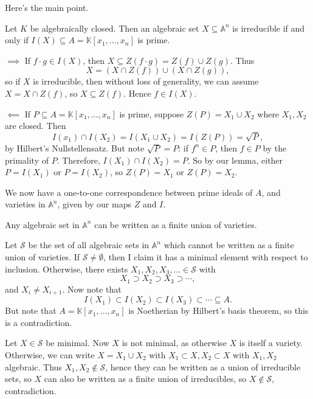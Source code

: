 \documentclass[12pt]{article}
\begin{document}
Here's the main point.

\begin{proposition}
	Let $K$ be algebraically closed. Then an algebraic set $X \subseteq \mathbb{A}^n$ is irreducible if and only if $I(X) \subseteq A = \mathbb{K}[x_1, \ldots, x_n]$ is prime.
\end{proposition}


\begin{proofbox}
	

	$\implies$ If $f \cdot g \in I(X)$, then $X \subseteq Z(f \cdot g) = Z(f) \cup Z(g)$. Thus
	\[
	X = (X \cap Z(f)) \cup (X \cap Z(g)),
	\]
	so if $X$ is irreducible, then without loss of generality, we can assume $X = X \cap Z(f)$, so $X \subseteq Z(f)$. Hence $f \in I(X)$.

	$\impliedby$ If $P \subseteq A = \mathbb{K}[x_1, \ldots, x_n]$ is prime, suppose $Z(P) = X_1 \cup X_2$ where $X_1, X_2$ are closed. Then
	\[
	I(x_1) \cap I(X_2) = I(X_1 \cup X_2) = I(Z(P)) = \sqrt P,
	\]
	by Hilbert's Nullstellensatz. But note $\sqrt P = P$: if $f^n \in P$, then $f \in P$ by the primality of $P$. Therefore, $I(X_1) \cap I(X_2) = P$. So by our lemma, either $P = I(X_1)$ or $P = I(X_2)$, so $Z(P) = X_1$ or $Z(P) = X_2$.
\end{proofbox}

We now have a one-to-one correspondence between prime ideals of $A$, and varieties in $\mathbb{A}^n$, given by our maps $Z$ and $I$.

\begin{proposition}
	Any algebraic set in $\mathbb{A}^n$ can be written as a finite union of varieties.
\end{proposition}

\begin{proofbox}
	Let $\mathcal{S}$ be the set of all algebraic sets in $\mathbb{A}^n$ which cannot be written as a finite union of varieties. If $\mathcal{S} \neq \emptyset$, then I claim it has a minimal element with respect to inclusion. Otherwise, there exists $X_1, X_2, X_3, \ldots \in \mathcal{S}$ with
	\[
	X_1 \supset X_2 \supset X_3 \supset \cdots,
	\]
	and $X_i \neq X_{i+1}$. Now note that
	\[
	I(X_1) \subset I(X_2) \subset I(X_3) \subset \cdots \subseteq A.
	\]
	But note that $A = \mathbb{K}[x_1, \ldots, x_n]$ is Noetherian by Hilbert's basis theorem, so this is a contradiction.

	Let $X \in \mathcal{S}$ be minimal. Now $X$ is not minimal, as otherwise $X$ is itself a variety. Otherwise, we can write $X = X_1 \cup X_2$ with $X_1 \subset X, X_2 \subset X$ with $X_1, X_2$ algebraic. Thus $X_1, X_2 \not \in \mathcal{S}$, hence they can be written as a union of irreducible sets, so $X$ can also be written as a finite union of irreducibles, so $X \not \in \mathcal{S}$, contradiction.
\end{proofbox}
\end{document}
